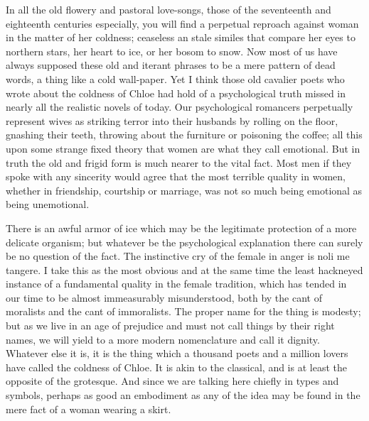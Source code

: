 \documentclass[final,10pt,letterpaper,twocolumn,openany]{book}
\begin{document}
In all the old flowery and pastoral love-songs, those of the seventeenth
and eighteenth centuries especially, you will find a perpetual reproach
against woman in the matter of her coldness; ceaseless an stale similes that
compare her eyes to northern stars, her heart to ice, or her bosom to snow.
Now most of us have always supposed these old and iterant phrases to be a
mere pattern of dead words, a thing like a cold wall-paper. Yet I think
those old cavalier poets who wrote about the coldness of Chloe had hold
of a psychological truth missed in nearly all the realistic novels of today.
Our psychological romancers perpetually represent wives as striking terror
into their husbands by rolling on the floor, gnashing their teeth, throwing
about the furniture or poisoning the coffee; all this upon some strange
fixed theory that women are what they call emotional. But in truth the old
and frigid form is much nearer to the vital fact. Most men if they spoke
with any sincerity would agree that the most terrible quality in women,
whether in friendship, courtship or marriage, was not so much being
emotional as being unemotional.

There is an awful armor of ice which may be the legitimate protection
of a more delicate organism; but whatever be the psychological
explanation there can surely be no question of the fact. The instinctive cry
of the female in anger is noli me tangere. I take this as the most obvious
and at the same time the least hackneyed instance of a fundamental quality
in the female tradition, which has tended in our time to be almost
immeasurably misunderstood, both by the cant of moralists and the cant of
immoralists. The proper name for the thing is modesty; but as we live in
an age of prejudice and must not call things by their right names, we will
yield to a more modern nomenclature and call it dignity. Whatever else it
is, it is the thing which a thousand poets and a million lovers have called
the coldness of Chloe. It is akin to the classical, and is at least the opposite
of the grotesque. And since we are talking here chiefly in types and
symbols, perhaps as good an embodiment as any of the idea may be found
in the mere fact of a woman wearing a skirt. 
\end{document}

